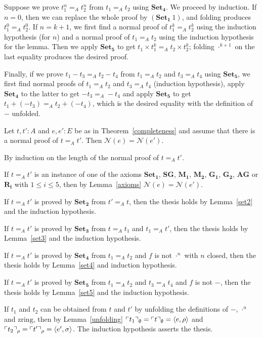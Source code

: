 \documentclass[numreferences]{kluwer}
\newcommand{\N}{\ensuremath{\mathcal{N}}}
\newcommand{\zring}{\ensuremath{\mathrm{zring}}}
\newcommand{\axiom}[1]{\ensuremath{\mathbf{#1}}}
\newcommand{\mlfn}[2]{\ensuremath\ulcorner{#1}\urcorner_{#2}}
\begin{document}
\begin{article}
\begin{pf}
Suppose we prove $t_1^n=_A t_2^n$ from $t_1=_A t_2$ using
\axiom{Set_4}.  We proceed by induction.  If $n=0$, then we can
replace the whole proof by $(\axiom{Set_1}\ 1)$, and folding produces
$t_1^0=_A t_2^0$.  If $n=k+1$, we first find a normal proof of
$t_1^k=_A t_2^k$ using the induction hypothesis (for $n$) and a normal
proof of $t_1=_A t_2$ using the induction hypothesis for the lemma.
Then we apply \axiom{Set_5} to get $t_1\times t_1^k=_A t_2\times
t_2^k$; folding $\cdot^{k+1}$ on the last equality produces the
desired proof.

Finally, if we prove $t_1-t_3=_A t_2-t_4$ from $t_1=_A t_2$ and
$t_3=_A t_4$ using \axiom{Set_5}, we first find normal proofs of
$t_1=_A t_2$ and $t_3=_A t_4$ (induction hypothesis), apply \axiom{Set_4}
to the latter to get $-t_3=_A -t_4$ and apply \axiom{Set_5} to get
$t_1+(-t_3)=_A t_2+(-t_4)$, which is the desired equality with the
definition of $-$ unfolded.
\end{pf}

\begin{theorem}\label{completenormal} 
Let $t,t':A$ and $e,e':E$ be as in Theorem~\ref{completeness} and
assume that there is a normal proof of $t=_A t'$.
Then $\N(e)=\N(e')$.
\end{theorem}
\begin{pf}
By induction on the length of the normal proof of $t=_A t'$.

If $t=_A t'$ is an instance of one of the axioms \axiom{Set_1},
\axiom{SG}, \axiom{M_1}, \axiom{M_2}, \axiom{G_1}, \axiom{G_2},
\axiom{AG} or \axiom{R_i} with $1\leq i\leq5$, then by Lemma~\ref{axioms}
$\N(e)=\N(e')$.

If $t=_A t'$ is proved by \axiom{Set_2} from $t'=_A t$, then the
thesis holds by Lemma~\ref{set2} and the induction hypothesis.

If $t=_A t'$ is proved by \axiom{Set_3} from $t=_A t_1$ and
$t_1=_A t'$, then the thesis holds by Lemma~\ref{set3} and the induction
hypothesis.

If $t=_A t'$ is proved by \axiom{Set_4} from $t_1=_A t_2$ and
$f$ is not $\cdot^n$ with $n$ closed, then the thesis holds by
Lemma~\ref{set4} and induction hypothesis.

If $t=_A t'$ is proved by \axiom{Set_5} from $t_1=_A t_2$ and $t_3=_A t_4$
and $f$ is not $-$, then the thesis holds by
Lemma~\ref{set5} and the induction hypothesis.

If $t_1$ and $t_2$ can be obtained from $t$ and $t'$ by unfolding the
definitions of $-$, $\cdot^n$ and $\zring$, then by Lemma~\ref{unfolding}
$\mlfn{t_1}{\emptyset}=\mlfn{t}{\emptyset}=\langle e,\rho\rangle$
and $\mlfn{t_2}{\rho}=\mlfn{t'}{\rho}=\langle e',\sigma\rangle$.
The induction hypothesis asserts the thesis.
\end{pf}


\end{article}
\end{document}
